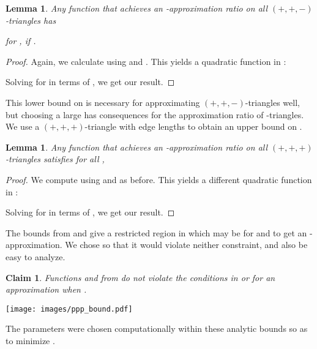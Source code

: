 \documentclass[11pt]{article}
\newtheorem{lemma}[theorem]{Lemma}
\newtheorem{claim}[theorem]{Claim}
\theoremstyle{definition}
\theoremstyle{remark}
\newtheorem{remark}[theorem]{Remark}
\newcommand{\ppp}{\ensuremath{(+,+,+)}}
\newcommand{\ppm}{\ensuremath{(+,+,-)}}
\begin{document}
\begin{lemma}
	\label{lem:fp_lower}
	Any function  that achieves an -approximation
        ratio on all \ppm-triangles has

for , if .
\end{lemma}

\begin{proof}
	Again, we calculate  using  and
	. This yields a quadratic function in :
	
	Solving for  in terms of , we get our result.
\end{proof}

This lower bound on  is necessary for approximating \ppm-triangles well,
but choosing a large  has consequences for the approximation ratio of
-triangles. We use a \ppp-triangle with edge lengths  to obtain
an upper bound on .

\begin{lemma}
	\label{lem:fp_upper}
Any function  that achieves an -approximation
ratio on all \ppp-triangles satisfies for all ,

\end{lemma}

\begin{proof}
	We compute  using  and
	 as before. This yields a different quadratic function in :
	
	Solving for  in terms of , we get our result.
\end{proof}

The bounds from  and  give a
restricted region in which  may be for  and  to get an -approximation. We chose 
so that it would violate neither constraint, and also be easy to analyze.

\begin{claim}
\iffalse
	Fix . Then
	
	does not violate
\fi
Functions  and  from  do not violate the conditions in  or  for an  approximation when .
\end{claim}
\begin{center}
	\texttt{[image: images/ppp\_bound.pdf]}
\end{center}

The parameters
 were chosen computationally within these analytic bounds so as to
minimize .

\iffalse
\begin{remark}
It turns out that the bound from the \ppp-triangle is the looser one, since a
\ppp-triangle with lenghts  is not the worst case, and indeed the
chosen values put  closer to the bound from the \ppm-triangle, which was
given by a tight case.
\todo{Tselil: add pointer to the complete analysis about this}
\end{remark}
\fi
\end{document}
